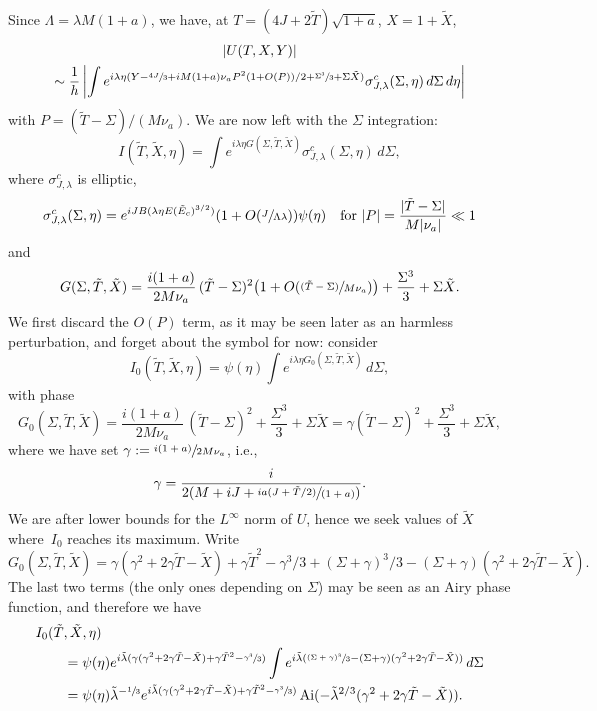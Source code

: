\documentclass[11pt]{article}
\newcommand{\ie}{i.e.,\xspace}
\newcommand{\psfrac}[2]{\sfrac{(#1)}{#2}}
\DeclareMathOperator{\Ai}{Ai}
\theoremstyle{plain}
\theoremstyle{definition}
\begin{document}
Since $\Lambda=\lambda M(1+a)$, we have, at $T=(4J+2\tilde T)\sqrt{1+a}$, $X=1+\tilde X$,
\begin{multline}
\label{eq:71}
|U(T,X,Y)|\\
\sim \frac 1h \left| \int e^{i\lambda\eta (Y-\sfrac{4J}{3}+i M (1+a) \nu_a P^{2}(1+O(P))/2 +\sfrac{\Sigma^{3}}{3}+\Sigma\tilde X)}\sigma^{c}_{J,\lambda}(\Sigma,\eta)\,d\Sigma \,d\eta \right|
\end{multline}
with $P=(\tilde T-\Sigma)/(M\nu_a)$. We are now left with the $\Sigma$ integration:
\begin{equation}
\label{eq:72}
I(\tilde T,\tilde X,\eta)=\int e^{i\lambda \eta G(\Sigma,\tilde T,\tilde X)}\sigma^{c}_{J,\lambda}(\Sigma,\eta)\,d\Sigma,
\end{equation}
where $\sigma^{c}_{J,\lambda}$ is elliptic,
\[
\sigma^{c}_{J,\lambda}(\Sigma,\eta)=e^{iJB(\lambda\eta E(\tilde E_c)^{3/2})}(1+O(\sfrac{J}{\Lambda\lambda}))\psi(\eta)\quad\text{for }|P|=\frac{|\tilde T-\Sigma|}{M|\nu_a|}\ll 1
\]
and
\begin{equation}
\label{eq:73}
G(\Sigma, \tilde T, \tilde X)=\frac{i(1+a)}{2M\nu_a}\, (\tilde T-\Sigma)^{2}\bigl(1+O(\psfrac{\tilde T-\Sigma}{M\nu_a})\bigr) +\frac{\Sigma^{3}}{3}+\Sigma\tilde X.
\end{equation}
We first discard the $O(P)$ term, as it may be seen later as an harmless perturbation, and forget about the symbol for now: consider
\begin{equation}
\label{eq:72bis}
I_{0}(\tilde T,\tilde X,\eta)=\psi(\eta)\int e^{i\lambda \eta G_{0}(\Sigma,\tilde T,\tilde X)}\,d\Sigma,
\end{equation}
with phase
\begin{equation}
\label{eq:73bis}
G_{0}(\Sigma,\tilde T, \tilde X)=\frac{i(1+a)}{2 M \nu_a}\, (\tilde T-\Sigma)^{2}+\frac{\Sigma^{3}}{3}+\Sigma\tilde X=\gamma (\tilde T-\Sigma)^2+\frac{\Sigma^3}{3}+\Sigma \tilde X,
\end{equation}
where we have set $\gamma:= \sfrac{i(1+a)}{2 M \nu_a}$, \ie
\[
\gamma=\frac{i}{2(M+i J+ \sfrac{ia(J+\tilde T/2)}{(1+a)})}.
\]
We are after lower bounds for the $L^{\infty}$ norm of $U$, hence we seek values of $\tilde X$ where~$I_0$ reaches its maximum. Write
\[
G_{0}(\Sigma,\tilde T, \tilde X)=\gamma(\gamma^2+2\gamma \tilde T-\tilde X)+\gamma \tilde T^2-\gamma^3/3+ (\Sigma+\gamma)^3/3-(\Sigma+\gamma)(\gamma^2+2\gamma \tilde T-\tilde X).
\]
The last two terms (the only ones depending on $\Sigma$) may be seen as an Airy phase function, and therefore we have
\begin{equation}\label{Airybound}
\begin{split}
I_0(\tilde T&,\tilde X,\eta)\\
&= \psi(\eta)e^{i\tilde \lambda (\gamma(\gamma^2+2\gamma \tilde T-\tilde X)+\gamma \tilde T^2-\sfrac{\gamma^3}3)}\int e^{i\tilde \lambda (\sfrac{(\Sigma+\gamma)^3}3-(\Sigma+\gamma)(\gamma^2+2\gamma \tilde T-\tilde X))} \,d\Sigma\\
&= \psi(\eta)\tilde\lambda^{-\sfrac 13}e^{i\tilde \lambda (\gamma(\gamma^2+2\gamma \tilde T-\tilde X)+\gamma \tilde T^2-\sfrac {\gamma^3}3)}\Ai(-\tilde\lambda^{2/3}(\gamma^2+2\gamma \tilde T-\tilde X)).
\end{split}
\end{equation}
\end{document}
